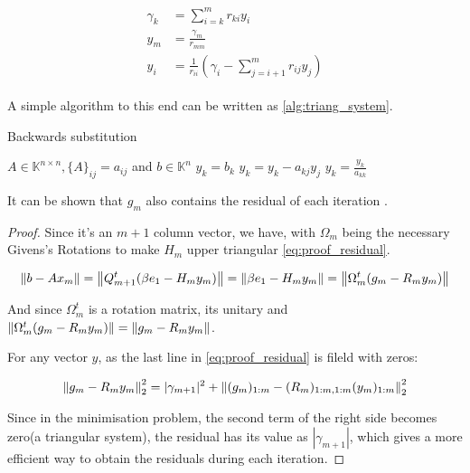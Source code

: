 \begin{align}\label{eq:triangular_system}
    \begin{split}
        \gamma_{k} &= \sum_{i=k}^{m} r_{ki} y_{i}\\
        y_{m} &= \frac{\gamma_{m}}{r_{mm}} \\
        y_{i} &= \frac{1}{r_{ii}} \left( \gamma_{i} - \sum_{j=i+1}^{m} r_{ij} y_{j}  \right)
    \end{split}
\end{align}

A simple algorithm to this end can be written as \ref{alg:triang_system}.

\begin{algorithm}
    \caption{Backwards substitution}\label{alg:triang_system}
    \begin{algorithmic}[1]
        \State $A \in \mathbb{K}^{n \times n}, \{ A \}_{ij} = a_{ij}$ and $b\in \mathbb{K}^{n}$
        \State $y_{k} = b_{k}$
        \State $y_{k} = y_{k} - a_{kj}y_{j}$
        \EndFor
        \State $y_{k} = \frac{y_{k}}{a_{kk}}$
        \EndFor
    \end{algorithmic}
\end{algorithm}



It can be shown that $g_{m}$ also contains the residual of each iteration \cite{saad2003iterative}.

\begin{proof}

    Since it's an $m+1$ column vector, we have, with $\Omega_{m}$ being the necessary Givens's Rotations to make $H_{m}$ upper triangular \ref{eq:proof_residual}.


    \begin{equation}\label{eq:proof_residual}
        \left\lVert b - Ax_{m}\right\rVert = \left\lVert Q_{m+1}^{t}(\beta e_{1} - H_{m}y_{m})\right\rVert = \left\lVert\beta e_{1} - H_{m}y_{m}\right\rVert = \left\lVert\Omega_{m}^{t} (g_{m} - R_{m}y_{m})\right\rVert
    \end{equation}

    And since $\Omega_{m}^{t}$ is a rotation matrix, its unitary and $\left\lVert\Omega_{m}^{t} (g_{m} - R_{m}y_{m})\right\rVert=\left\lVert g_{m} - R_{m}y_{m}\right\rVert$.

    For any vector $y$, as the last line in \ref{eq:proof_residual} is fileld with zeros:

    \begin{equation}
        \left\lVert g_{m} - R_{m}y_{m}\right\rVert_{2}^{2} = |\gamma_{m+1}|^{2} + \left\lVert(g_{m})_{1:m} - (R_{m})_{1:m,1:m} (y_{m})_{1:m}\right\rVert_{2}^{2}
    \end{equation}

    Since in the minimisation problem, the second term of the right side becomes zero(a triangular system), the residual has its value as $|\gamma_{m+1}|$, which gives a more efficient way to obtain the residuals during each iteration.
\end{proof}

